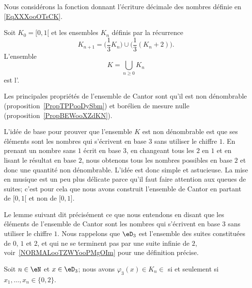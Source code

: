 Nous considérons la fonction donnant l'écriture décimale des nombres définie en \eqref{EqXXXooOTsCK}.

\begin{definition}  \label{DefIYDooVIDJs}
    Soit \( K_0=\mathopen[ 0 , 1 [\) et les ensembles \( K_n\) définis par la récurrence
        \begin{equation}
            K_{n+1}=\big( \frac{1}{ 3 }K_n \big)\cup\big( \frac{1}{ 3 }(K_n+2) \big).
        \end{equation}
        L'ensemble
        \begin{equation}
            K=\bigcup_{n\geq 0}K_n
        \end{equation}
        est l'.
\end{definition}
Les principales propriétés de l'ensemble de Cantor sont qu'il est non dénombrable (proposition~\ref{PropTPPooDySbm}) et borélien de mesure nulle (proposition~\ref{PropBEWooXZdKN}).

\begin{normaltext}
    L'idée de base pour prouver que l'ensemble \( K\) est non dénombrable est que ses éléments sont les nombres qui s'écrivent en base \( 3\) sans utiliser le chiffre \( 1\). En prenant un nombre sans \( 1\) écrit en base \( 3\), en changeant tous les \( 2\) en \( 1\) et en lisant le résultat en base \( 2\), nous obtenons tous les nombres possibles en base \( 2\) et donc une quantité non dénombrable. L'idée est donc simple et astucieuse. La mise en musique est un peu plus délicate parce qu'il faut faire attention aux queues de suites; c'est pour cela que nous avons construit l'ensemble de Cantor en partant de \( \mathopen[ 0 , 1 [\) et non de \( \mathopen[ 0 , 1 \mathclose]\).
\end{normaltext}

Le lemme suivant dit précisément ce que nous entendons en disant que les éléments de l'ensemble de Cantor sont les nombres qui s'écrivent en base \( 3\) sans utiliser le chiffre \( 1\). Nous rappelons que \( \eD_3\) est l'ensemble des suites constituées de \( 0\), \( 1\) et \( 2\), et qui ne se terminent pas par une suite infinie de \( 2\), voir~\ref{NORMALooTZWYooPMgOIm} pour une définition précise.
\begin{lemma}   \label{LemAZGoosKzEm}
    Soit \( n\in \eN\) et \( x\in \eD_3\); nous avons \( \varphi_3(x)\in K_n\in\) si et seulement si \( x_1,\ldots, x_n\in\{ 0,2 \}\).
\end{lemma}

